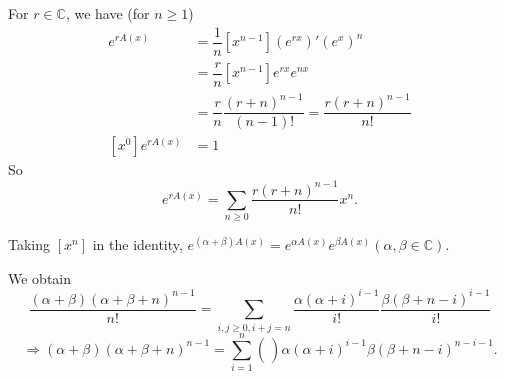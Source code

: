 \begin{theorem}
For $r\in \mathbb{C}$, we have (for $n\geq 1$)
\begin{align*}
[x^n]e^{rA(x)} &= \dfrac{1}{n}[x^{n-1}](e^{rx})'(e^x)^n\\
&=\dfrac{r}{n}[x^{n-1}]e^{rx}e^{nx}\\
&=\dfrac{r}{n}\dfrac{(r+n)^{n-1}}{(n-1)!}=\dfrac{r(r+n)^{n-1}}{n!}\\
[x^0]e^{rA(x)}&=1
\end{align*}
So $$e^{rA(x)}=\sum_{n\geq 0}\dfrac{r(r+n)^{n-1}}{n!}x^n.$$

Taking $[x^n]$ in the identity,
$e^{(\alpha +\beta)A(x)}=e^{\alpha A(x)}e^{\beta A(x)}(\alpha , \beta \in \mathbb{C}).$

We obtain
$$\dfrac{(\alpha+\beta)(\alpha+\beta+n)^{n-1}}{n!}=\sum\limits_{i,j\geq 0, i+j=n} \dfrac{\alpha(\alpha+i)^{i-1}}{i!}\dfrac{\beta(\beta+n-i)^{i-1}}{i!}$$
$$\Rightarrow (\alpha+\beta)(\alpha+\beta+n)^{n-1}=\sum\limits_{i=1}^n{\binom{}{}} \alpha (\alpha+i)^{i-1} \beta (\beta+n-i)^{n-i-1}.$$

\end{theorem}

